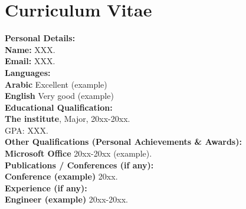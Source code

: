 \chapter*{Curriculum Vitae}
\makeatletter
\begingroup
\begin{center}
\end{center}
\endgroup
\makeatother
{}
{}
\begingroup
\newcommand{\addtoLeft}{\setlength{\leftskip}{2cm}\noindent}
\newcommand{\indentBig}{\setlength{\leftskip}{6cm} \noindent}
\setlength{\parskip}{1ex}


\begin{singlespace}
\addtoLeft\textbf{ Personal Details:}\\

\indentBig
	\textbf{Name:}  XXX. \\
	\textbf{Email:} XXX.\\


\addtoLeft\textbf{ Languages:}\\

\indentBig
\textbf{Arabic }  \indent Excellent (example)\\
\textbf{English}  \indent Very good (example)\\


\addtoLeft\textbf{ Educational Qualification:}\\
	
\indentBig
\textbf{The institute}, Major, 20xx-20xx. \\ 
 GPA: XXX.\\


\addtoLeft\textbf{ Other Qualifications (Personal Achievements \& Awards):}\\	

\indentBig
\textbf{Microsoft Office} 20xx-20xx (example).\\


\addtoLeft\textbf{ Publications / Conferences (if any):}\\

\indentBig	
\textbf{Conference (example)} 20xx.\\


\addtoLeft\textbf{ Experience (if any):}\\

\indentBig	
\textbf{Engineer (example)} 20xx-20xx.\\


\end{singlespace}


\endgroup